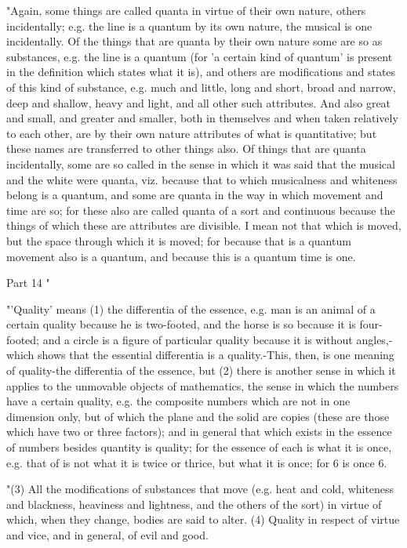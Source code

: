 "Again, some things are called quanta in virtue of their own nature,
others incidentally; e.g. the line is a quantum by its own nature,
the musical is one incidentally. Of the things that are quanta by
their own nature some are so as substances, e.g. the line is a quantum
(for 'a certain kind of quantum' is present in the definition which
states what it is), and others are modifications and states of this
kind of substance, e.g. much and little, long and short, broad and
narrow, deep and shallow, heavy and light, and all other such attributes.
And also great and small, and greater and smaller, both in themselves
and when taken relatively to each other, are by their own nature attributes
of what is quantitative; but these names are transferred to other
things also. Of things that are quanta incidentally, some are so called
in the sense in which it was said that the musical and the white were
quanta, viz. because that to which musicalness and whiteness belong
is a quantum, and some are quanta in the way in which movement and
time are so; for these also are called quanta of a sort and continuous
because the things of which these are attributes are divisible. I
mean not that which is moved, but the space through which it is moved;
for because that is a quantum movement also is a quantum, and because
this is a quantum time is one. 

Part 14 "

"'Quality' means (1) the differentia of the essence, e.g. man is an
animal of a certain quality because he is two-footed, and the horse
is so because it is four-footed; and a circle is a figure of particular
quality because it is without angles,-which shows that the essential
differentia is a quality.-This, then, is one meaning of quality-the
differentia of the essence, but (2) there is another sense in which
it applies to the unmovable objects of mathematics, the sense in which
the numbers have a certain quality, e.g. the composite numbers which
are not in one dimension only, but of which the plane and the solid
are copies (these are those which have two or three factors); and
in general that which exists in the essence of numbers besides quantity
is quality; for the essence of each is what it is once, e.g. that
of is not what it is twice or thrice, but what it is once; for 6 is
once 6. 

"(3) All the modifications of substances that move (e.g. heat and
cold, whiteness and blackness, heaviness and lightness, and the others
of the sort) in virtue of which, when they change, bodies are said
to alter. (4) Quality in respect of virtue and vice, and in general,
of evil and good. 

